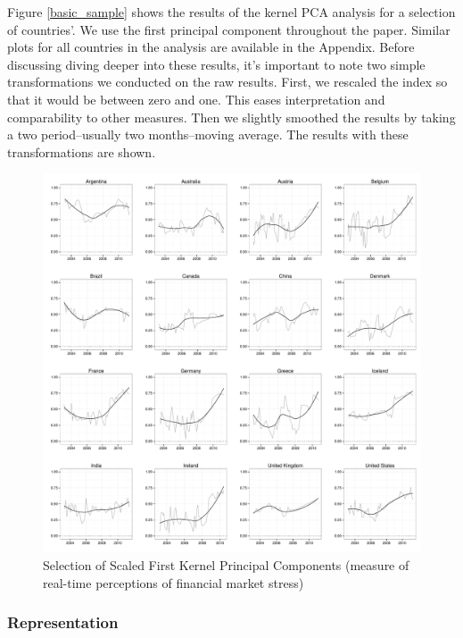 \documentclass[]{article}
\begin{document}
Figure \ref{basic_sample} shows the results of the kernel PCA analysis
for a selection of countries'. We use the first principal component
throughout the paper. Similar plots for all countries in the analysis
are available in the Appendix. Before discussing diving deeper into
these results, it's important to note two simple transformations we
conducted on the raw results. First, we rescaled the index so that it
would be between zero and one. This eases interpretation and
comparability to other measures. Then we slightly smoothed the results
by taking a two period--usually two months--moving average. The results
with these transformations are shown.

\begin{figure}
    \caption{Selection of Scaled First Kernel Principal Components (measure of real-time perceptions of financial market stress)}
    \label{scree_plot}
    \begin{center}
        \includegraphics[scale=0.4]{analysis/figures/select_scores.pdf}
    \end{center}
\end{figure}

\subsubsection{Representation}\label{representation}
\end{document}
